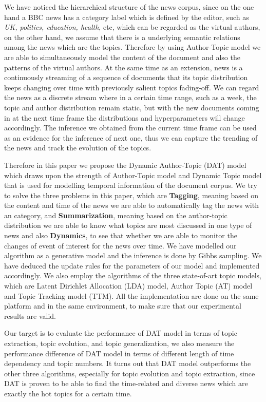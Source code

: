 We have noticed the hierarchical structure of the news corpus, since on the one hand a BBC news has a category label which is defined by the editor, such as \textit{UK, politics, education, health}, etc, which can be regarded as the virtual authors, on the other hand, we assume that there is a underlying semantic relations among the news which are the  topics. Therefore by using Author-Topic model we are able to simultaneously model the content of the document and also the patterns
of the virtual authors. At the same time as an extension, news  is a continuously streaming of a sequence
of documents that its topic distribution keeps changing over time with previously salient topics fading-off. We can regard the news as a discrete stream where in a certain time range, such as a week, the topic and author distribution remain static, but with the new documents coming in at the next time frame the distributions and hyperparameters will change accordingly. The inference we obtained from the current time frame can be used as an evidence for the inference of next one, thus we can capture the trending of the news and track the evolution of the topics. 

Therefore in this paper we propose the Dynamic Author-Topic (DAT) model which draws upon the strength of Author-Topic model and Dynamic Topic model that is used for modelling temporal information of the document corpus. We try to solve the three problems in this paper, which are \textbf{Tagging}, meaning based on the content and time of the news we are able to automatically
tag the news with an category, and \textbf{Summarization}, meaning based on the author-topic distribution we are able to know what
topics are most discussed in one type of news
 and also \textbf{Dynamics},  to see that whether we are able to monitor the changes of event of interest for the
news over time. We have modelled our algorithm as a generative model and the inference is done by Gibbs sampling. We have deduced the update rules for the parameters of our model and implemented accordingly. We also employ the algorithms of the three state-of-art topic models, which are Latent Dirichlet Allocation (LDA) model, Author Topic (AT) model and Topic Tracking model (TTM). All the  implementation are done on the same platform and in the same environment, to make sure that our experimental results are valid.

Our target is to evaluate the performance of DAT model in terms of topic extraction, topic evolution, and topic generalization, we also measure the performance difference of DAT model in terms of different length of time dependency and topic numbers. It turns out that DAT model outperforms the other three algorithms, especially for topic evolution and topic extraction, since DAT is proven to be able to find the time-related and diverse news which are exactly the hot topics for a certain time. 

